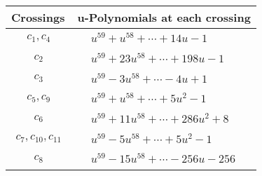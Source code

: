 \documentclass[1p]{elsarticle_modified}
\theoremstyle{definition}
\begin{document}
\begin{tabular}{m{50pt}|m{274pt}}
Crossings & \hspace{64pt}u-Polynomials at each crossing \\
\hline $$\begin{aligned}c_{1},c_{4}\end{aligned}$$&$\begin{aligned}
&u^{59}+u^{58}+\cdots+14 u-1
\end{aligned}$\\
\hline $$\begin{aligned}c_{2}\end{aligned}$$&$\begin{aligned}
&u^{59}+23 u^{58}+\cdots+198 u-1
\end{aligned}$\\
\hline $$\begin{aligned}c_{3}\end{aligned}$$&$\begin{aligned}
&u^{59}-3 u^{58}+\cdots-4 u+1
\end{aligned}$\\
\hline $$\begin{aligned}c_{5},c_{9}\end{aligned}$$&$\begin{aligned}
&u^{59}+u^{58}+\cdots+5 u^2-1
\end{aligned}$\\
\hline $$\begin{aligned}c_{6}\end{aligned}$$&$\begin{aligned}
&u^{59}+11 u^{58}+\cdots+286 u^2+8
\end{aligned}$\\
\hline $$\begin{aligned}c_{7},c_{10},c_{11}\end{aligned}$$&$\begin{aligned}
&u^{59}-5 u^{58}+\cdots+5 u^2-1
\end{aligned}$\\
\hline $$\begin{aligned}c_{8}\end{aligned}$$&$\begin{aligned}
&u^{59}-15 u^{58}+\cdots-256 u-256
\end{aligned}$\\
\hline
\end{tabular}\\~\\
\newpage\renewcommand{\arraystretch}{1}
\end{document}
